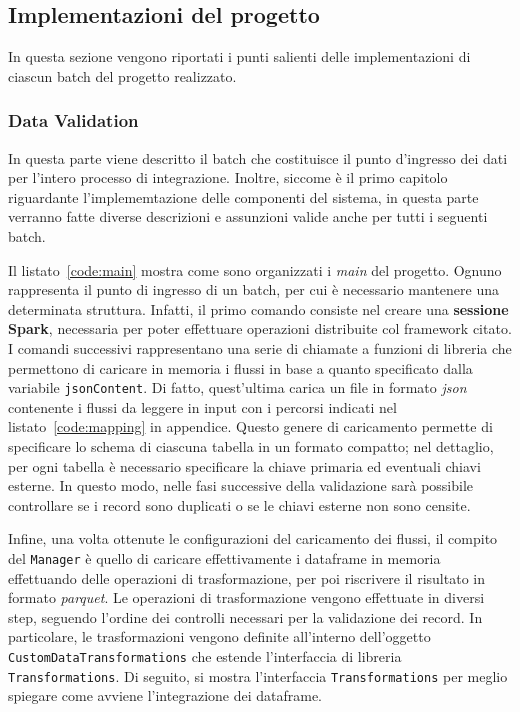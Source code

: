 \subsection{Implementazioni del progetto}\label{subsec:project-implementation}
In questa sezione vengono riportati i punti salienti delle implementazioni di ciascun batch del progetto realizzato.

\subsubsection{Data Validation}\label{subsubsec:data}
In questa parte viene descritto il batch che costituisce il punto d'ingresso dei dati per l'intero processo di integrazione.
Inoltre, siccome è il primo capitolo riguardante l'implememtazione delle componenti del sistema, in questa parte verranno fatte diverse descrizioni e assunzioni valide anche per tutti i seguenti batch.

Il listato~\ref{code:main} mostra come sono organizzati i \textit{main} del progetto.
Ognuno rappresenta il punto di ingresso di un batch, per cui è necessario mantenere una determinata struttura.
Infatti, il primo comando consiste nel creare una \textbf{sessione Spark}, necessaria per poter effettuare operazioni distribuite col framework citato.
I comandi successivi rappresentano una serie di chiamate a funzioni di libreria che permettono di caricare in memoria i flussi in base a quanto specificato dalla variabile \texttt{jsonContent}.
Di fatto, quest'ultima carica un file in formato \textit{json} contenente i flussi da leggere in input con i percorsi indicati nel listato~\ref{code:mapping} in appendice.
Questo genere di caricamento permette di specificare lo schema di ciascuna tabella in un formato compatto;
nel dettaglio, per ogni tabella è necessario specificare la chiave primaria ed eventuali chiavi esterne.
In questo modo, nelle fasi successive della validazione sarà possibile controllare se i record sono duplicati o se le chiavi esterne non sono censite.



Infine, una volta ottenute le configurazioni del caricamento dei flussi, il compito del \texttt{Manager} è quello di caricare effettivamente i dataframe in memoria effettuando delle operazioni di trasformazione, per poi riscrivere il risultato in formato \textit{parquet}.
Le operazioni di trasformazione vengono effettuate in diversi step, seguendo l'ordine dei controlli necessari per la validazione dei record.
In particolare, le trasformazioni vengono definite all'interno dell'oggetto \texttt{CustomDataTransformations} che estende l'interfaccia di libreria \texttt{Transformations}.
Di seguito, si mostra l'interfaccia \texttt{Transformations} per meglio spiegare come avviene l'integrazione dei dataframe.

